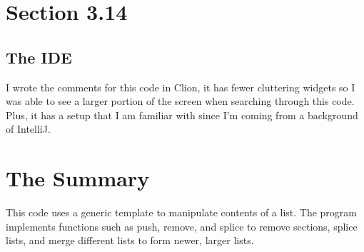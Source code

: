 \documentclass[11pt]{article}
\begin{document}
\newpage
\section*{Section 3.14}
\subsection*{The IDE}
I wrote the comments for this code in Clion, it has fewer cluttering widgets so I was able to see a larger portion of the screen when searching through this code. Plus, it has a setup that I am familiar with since I'm coming from a background of IntelliJ.

\section*{The Summary}
This code uses a generic template to manipulate contents of a list. The program implements functions such as push, remove, and splice to remove sections, splice lists, and merge different lists to form newer, larger lists. 
\end{document}
